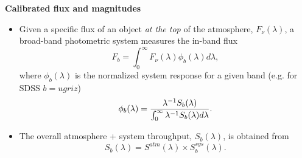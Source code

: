 \documentclass[letterpaper,landscape]{slides}
\begin{document}


\begin{slide}
\begin{center}
\bfseries
{\large {\color{red} Calibrated flux and magnitudes}}
\end{center}
\vskip 0.6in

\begin{itemize}
\item 
Given a specific flux of an object {\it at the top} of the atmosphere, 
$F_\nu(\lambda)$, a broad-band photometric system measures the in-band flux
\begin{equation}
\label{Fb}
           F_b = \int_0^\infty {F_\nu(\lambda) \phi_b(\lambda) d\lambda},
\end{equation}
where $\phi_b(\lambda)$ is the normalized system response for a given 
band (e.g. for SDSS $b=ugriz$)
\begin{equation}
\label{PhiDef}
\phi_b(\lambda) = {\lambda^{-1} S_b(\lambda) \over \int_0^\infty {\lambda^{-1} S_b(\lambda) d\lambda}}.
\end{equation}
\item
The overall atmosphere + system throughput, $S_b(\lambda)$, is obtained from  
\begin{equation}
\label{SDef}
         S_b(\lambda) = S^{atm}(\lambda) \times S_b^{sys}(\lambda). 
\end{equation}
\end{itemize} 

\end{slide}
 
\end{document}
